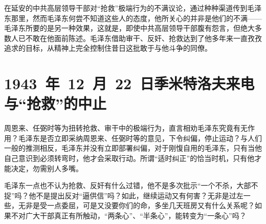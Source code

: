 在延安的中共高层领导干部对“抢救”极端行为的不满议论，通过种种渠道传到毛泽东那里，然而毛泽东何尝不知道这些人的态度，他所关心的并非是他们的不满——毛泽东所要的是另一种效果，这就是，即使中共高层领导干部腹有怨言，但绝大多数人已不敢在他面前陈述。毛泽东借助审干、反奸、抢救达到了他多年来一直孜孜追求的目标，从精神上完全控制住昔日这批敢于与他斗争的同僚。

\section{1943~年~12~月~22~日季米特洛夫来电与“抢救”的中止}

周恩来、任弼时等为扭转抢救、审干中的极端行为，直言相劝毛泽东究竟有无作用？毛泽东是否立即采纳周恩来、任弼时等的意见，下令纠偏，停止运动？与人们一般的推测相反，毛泽东并没有立即部署纠偏，对于刚愎自用的毛泽东，只有当他自己意识到必须转弯时，他才会采取行动。所谓“适时纠正”的恰当时机，只有他才能决定，勿需别人多嘴。

毛泽东一点也不认为抢救、反奸有什么过错，他不是多次批示“一个不杀，大部不捉”吗？他不是提出反对“逼供信”吗？如此，继续运动又有何害？无非是过左一些，无非是受一点委屈，可是又没要你们的命，多坐几天班房又有什么关系呢？如果不对广大干部真正有所触动，“两条心”、“半条心”，能转变为“一条心”吗？

